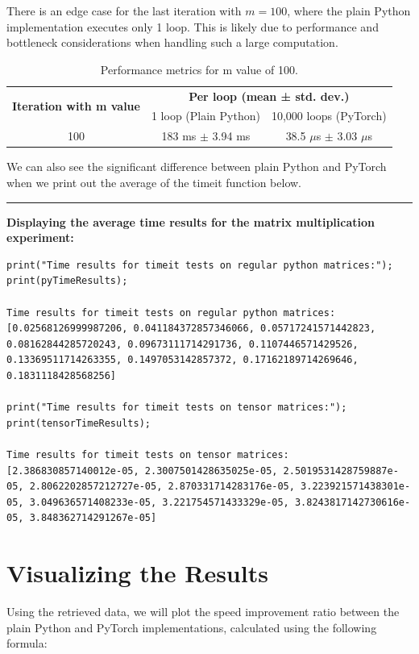 \documentclass[12pt]{article}
\begin{document}
\noindent There is an edge case for the last iteration with \( m = 100 \),
where the plain Python implementation executes only 1 loop.
This is likely due to performance and bottleneck considerations
when handling such a large computation.

\begin{table}[ht]
    \centering
    \begin{tabular}{|c|c|c|}
        \hline
        \multirow{2}{*}{\textbf{Iteration with m value}} & \multicolumn{2}{c|}{\textbf{Per loop (mean ± std. dev.)}} \\
        \cline{2-3}
        & 1 loop (Plain Python) & 10,000 loops (PyTorch) \\
        \hline
        100 & 183 ms $\pm$ 3.94 ms & 38.5 $\mu$s $\pm$ 3.03 $\mu$s \\
        \hline
    \end{tabular}
    \caption{Performance metrics for m value of 100.}
\end{table}

\noindent We can also see the significant difference between plain Python and PyTorch when we
print out the average of the timeit function below.

\noindent\rule{\textwidth}{0.4pt}
\noindent\textbf{Displaying the average time results for the matrix multiplication experiment:}
\begin{lstlisting}
print("Time results for timeit tests on regular python matrices:");
print(pyTimeResults);

Time results for timeit tests on regular python matrices:
[0.02568126999987206, 0.041184372857346066, 0.05717241571442823, 0.08162844285720243, 0.09673111714291736, 0.1107446571429526, 0.13369511714263355, 0.1497053142857372, 0.17162189714269646, 0.1831118428568256]

print("Time results for timeit tests on tensor matrices:");
print(tensorTimeResults);

Time results for timeit tests on tensor matrices:
[2.386830857140012e-05, 2.3007501428635025e-05, 2.5019531428759887e-05, 2.8062202857212727e-05, 2.870331714283176e-05, 3.223921571438301e-05, 3.049636571408233e-05, 3.221754571433329e-05, 3.8243817142730616e-05, 3.848362714291267e-05]
\end{lstlisting}

\section{Visualizing the Results}
Using the retrieved data, we will plot the speed improvement ratio between the plain Python and PyTorch implementations, calculated using the following formula:
\end{document}
